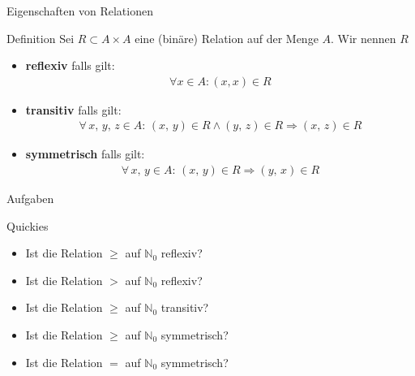 \begin{frame}{Eigenschaften von Relationen}
    \begin{block}{Definition}
        Sei $R \subset A \times A$ eine (binäre) Relation auf der Menge $A$. Wir nennen $R$
        \begin{itemize}
            \item \textbf{reflexiv} falls gilt:
                \begin{align*}
                    \forall x \in A: \left( x,x\right) \in R
                \end{align*}
            \item\textbf{transitiv} falls gilt:
                \begin{align*}
                    \forall\, x,\, y,\, z \in A:\,\left( x,\, y\right) \in R \wedge \left(y,\, z\right) \in R \Rightarrow \left( x,\, z\right) \in R
                \end{align*}
            \item \textbf{symmetrisch} falls gilt:
                \begin{align*}
                    \forall\, x,\, y \in A:\,\left( x,\, y\right) \in R \Rightarrow \left( y,\, x\right) \in R
                \end{align*}
        \end{itemize}
    \end{block}
\end{frame}

\begin{frame}{Aufgaben}
    \begin{block}{Quickies}
        \begin{itemize}
            \item Ist die Relation $\geq$ auf $\mathbb{N}_0$ reflexiv? \pause {}
            \item Ist die Relation $>$ auf $\mathbb{N}_0$ reflexiv? \pause {}
            \item Ist die Relation $\geq$ auf $\mathbb{N}_0$ transitiv? \pause {}
            \item Ist die Relation $\geq$ auf $\mathbb{N}_0$ symmetrisch? \pause {}
            \item Ist die Relation $=$ auf $\mathbb{N}_0$ symmetrisch? \pause {}
        \end{itemize}
    \end{block}
\end{frame}

